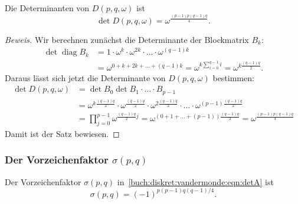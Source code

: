 \begin{satz}
\label{buch:diskret:faktorisierung:satz:detD}
Die Determinanten von $D(p,q,\omega)$ ist
\[
\det D(p,q,\omega)
=
\omega^{\frac{(p-1)p(q-1)q}4}.
\]
\end{satz}

\begin{proof}[Beweis]
Wir berechnen zunächst die Determinante der Blockmatrix $B_k$:
\begin{align*}
\det \operatorname{diag}B_k
&=
1\cdot \omega^k\cdot \omega^{2k} \cdot \ldots \cdot \omega^{(q-1)k}
\\
&=
\omega^{0+k+2k+\dots+(q-1)k}
=
\omega^{k\sum_{i=0}^{q-1}i}
=
\omega^{k\frac{(q-1)q}2}.
\end{align*}
Daraus lässt sich jetzt die Determinante von $D(p,q,\omega)$ bestimmen:
\begin{align*}
\det D(p,q,\omega)
&=
\det B_0\det B_1\cdot\ldots\cdot B_{p-1}
\\
&=
\omega^{k\frac{(q-1)q}2}
\cdot
\omega^{\frac{(q-1)q}2}
\cdot
\omega^{2\frac{(q-1)q}2}
\cdot
\ldots
\cdot
\omega^{(p-1)\frac{(q-1)q}2}
\\
&=
\prod_{j=0}^{p-1}
\omega^{\frac{(q-1)q}2j}
=
\omega^{(0+1+\dots+(p-1))\frac{(q-1)q}2}
=
\omega^{\frac{(p-1)p(q-1)q}4}
\end{align*}
Damit ist der Satz bewiesen.
\end{proof}

%
%
\subsubsection{Der Vorzeichenfaktor $\sigma(p,q)$}

%
%
\begin{satz}
\label{buch:diskret:faktorisierung:satz:vorzeichen}
Der Vorzeichenfaktor $\sigma(p,q)$
in~\eqref{buch:diskret:vandermonde:eqn:detA}
ist
\[
\sigma(p,q)
=
(-1)^{p(p-1)q(q-1)/4}.
\]
\end{satz}

